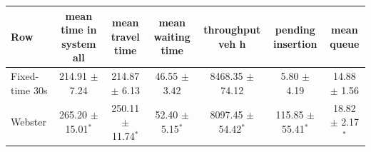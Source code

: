 \begin{tabular}{lcccccc}
\toprule
Row & mean time in system all & mean travel time & mean waiting time & throughput veh h & pending insertion & mean queue \\
\midrule
Fixed-time 30s & 214.91 $\pm$ 7.24 & 214.87 $\pm$ 6.13 & 46.55 $\pm$ 3.42 & 8468.35 $\pm$ 74.12 & 5.80 $\pm$ 4.19 & 14.88 $\pm$ 1.56 \\
Webster & 265.20 $\pm$ 15.01$^{*}$ & 250.11 $\pm$ 11.74$^{*}$ & 52.40 $\pm$ 5.15$^{*}$ & 8097.45 $\pm$ 54.42$^{*}$ & 115.85 $\pm$ 55.41$^{*}$ & 18.82 $\pm$ 2.17$^{*}$ \\
\bottomrule
\end{tabular}
